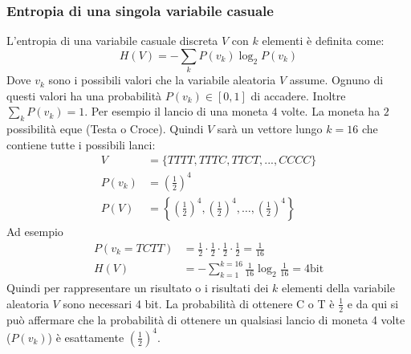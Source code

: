 \subsubsection{Entropia di una singola variabile casuale}
L'entropia di una variabile casuale discreta $V$ con $k$ elementi è definita come:
\[
H(V)=-\sum_k P(v_k)\log_2P(v_k)
\]
Dove $v_k$ sono i possibili valori che la variabile aleatoria $V$ assume.
Ognuno di questi valori ha una probabilità $P(v_k) \in [0,1]$ di accadere. Inoltre $\sum_k P(v_k)=1$.
Per esempio il lancio di una moneta $4$ volte. La moneta ha $2$ possibilità eque (Testa o Croce). 
Quindi $V$ sarà un vettore lungo $k=16$ che contiene tutte i possibili lanci:
\begin{align}
    V&=
        \{TTTT,TTTC,TTCT,...,CCCC\}\\
    P(v_k)&=\left( \frac{1}{2} \right)^4\\
    P(V)&=
    \left\{
        \left( \frac{1}{2} \right)^4,
        \left( \frac{1}{2} \right)^4,
        \dots,
        \left( \frac{1}{2} \right)^4
    \right\}
\end{align}
Ad esempio
\begin{align}
    P(v_k=TCTT)&=\frac{1}{2}\cdot\frac{1}{2}\cdot\frac{1}{2}\cdot\frac{1}{2}= \frac{1}{16}\\
    H(V)&=-\sum_{k=1}^{k=16} \frac{1}{16}\log_2 \frac{1}{16}= 4\text{bit}
\end{align}
Quindi per rappresentare un risultato o i risultati dei $k$ elementi della variabile aleatoria $V$ sono necessari 4 bit.
La probabilità di ottenere C o T è $\frac{1}{2}$ e da qui si può affermare che la probabilità di ottenere un qualsiasi lancio di moneta 4 volte ($P(v_k)$) è esattamente $\left(\frac{1}{2}\right)^4$.\\


